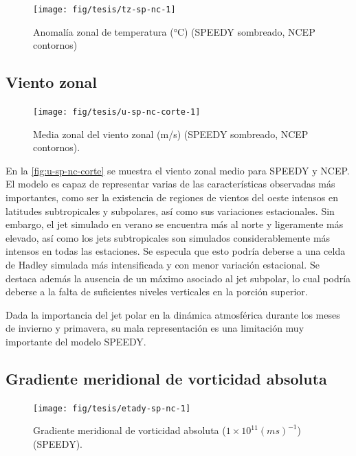 \documentclass[spanish,a4paper,12pt,oneside]{book}
\begin{document}
\begin{landscape}\begin{figure}

{\centering \texttt{[image: fig/tesis/tz-sp-nc-1]} 

}

\caption{Anomalía zonal de temperatura (°C) (SPEEDY sombreado, NCEP contornos)}\label{fig:tz-sp-nc}
\end{figure}
\end{landscape}

\subsection{Viento zonal}\label{viento-zonal-1}

\begin{figure}
\texttt{[image: fig/tesis/u-sp-nc-corte-1]} \caption{Media zonal del viento zonal (m/s) (SPEEDY sombreado, NCEP contornos).}\label{fig:u-sp-nc-corte}
\end{figure}

En la \autoref{fig:u-sp-nc-corte} se muestra el viento zonal medio para
SPEEDY y NCEP. El modelo es capaz de representar varias de las
características observadas más importantes, como ser la existencia de
regiones de vientos del oeste intensos en latitudes subtropicales y
subpolares, así como sus variaciones estacionales. Sin embargo, el jet
simulado en verano se encuentra más al norte y ligeramente más elevado,
así como los jets subtropicales son simulados considerablemente más
intensos en todas las estaciones. Se especula que esto podría deberse a
una celda de Hadley simulada más intensificada y con menor variación
estacional. Se destaca además la ausencia de un máximo asociado al jet
subpolar, lo cual podría deberse a la falta de suficientes niveles
verticales en la porción superior.

Dada la importancia del jet polar en la dinámica atmosférica durante los
meses de invierno y primavera, su mala representación es una limitación
muy importante del modelo SPEEDY.

\subsection{Gradiente meridional de vorticidad
absoluta}\label{gradiente-meridional-de-vorticidad-absoluta}

\begin{landscape}\begin{figure}

{\centering \texttt{[image: fig/tesis/etady-sp-nc-1]} 

}

\caption{Gradiente meridional de vorticidad absoluta ($1\times10^{11}(ms)^{-1}$) (SPEEDY).}\label{fig:etady-sp-nc}
\end{figure}
\end{landscape}
\end{document}
